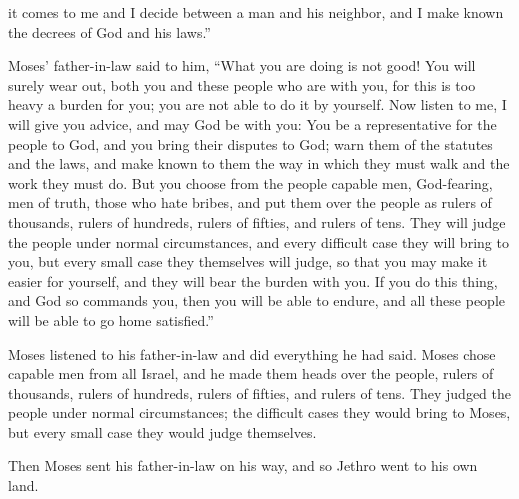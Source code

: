 {it comes
to
me and I decide
between
a man
and his neighbor,
and I make known
the
decrees
of God
and his laws.”
\par }{\PP {}Moses’
father-in-law
said
to him,
“What
you
are doing
is not
good!
You will surely
wear
out, both
you
and these
people
who
are with
you, for
this is too heavy
a burden
for you; you are not
able
to do
it by yourself.
Now
listen
to me,
I will give you advice,
and may God
be with
you: You be a representative
for the people
to God,
and you
bring
their disputes
to
God;
warn
them
of the
statutes
and the
laws,
and make known
to them the way
in which
they must walk
and the
work
they must do.
But you
choose
from the people
capable
men,
God-fearing,
men
of truth,
those who hate
bribes,
and put
them over
the people as rulers
of thousands,
rulers
of hundreds,
rulers
of fifties,
and rulers
of tens.
They will judge
the
people
under normal
circumstances,
and every
difficult
case they will bring
to
you, but every
small
case they themselves
will judge,
so that you may make it easier
for yourself, and they
will bear
the burden with you.
If
you do
this
thing,
and God
so
commands
you, then you will be able
to endure,
and all
these
people
will be able to go
home
satisfied.”
\par }{\PP {}Moses
listened
to his father-in-law
and did
everything
he had
said.
Moses
chose
capable
men
from all
Israel,
and he made
them heads
over
the people,
rulers
of thousands,
rulers
of hundreds,
rulers
of fifties,
and rulers
of tens.
They judged
the people
under normal
circumstances;
the difficult
cases
they would bring
to
Moses,
but every
small
case they would judge
themselves.
\par }{\PP {}Then Moses
sent
his father-in-law
on his way, and so Jethro went
to
his own land.


}
